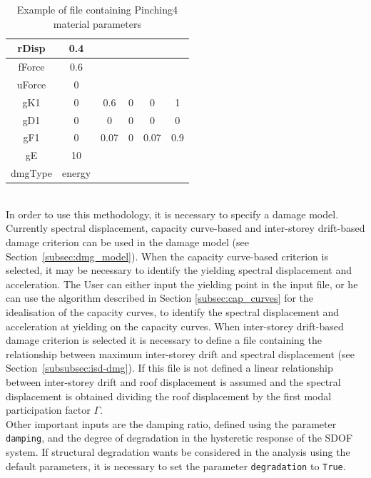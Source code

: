 \begin {table}[htb]
\caption{Example of file containing Pinching4 material parameters}
\label{table:pinching4}
\begin{center}
  \begin{tabular}{ | c | c | c | c | c | c |}
  \hline
	rDisp  & 0.4	&	&	&	 &	\\ \hline
	fForce	 & 0.6 &	&	&	 &	\\ \hline
	uForce	 & 0	&	&	&	 &	\\ \hline
	gK1	 & 0  &	0.6  &	0  &	0	 & 1\\ \hline
	gD1	 & 0	 & 0  &	0  &	0  &	0\\ \hline
	gF1	 & 0  &	0.07	 & 0  &	0.07  &	0.9\\ \hline
	gE	 & 10 &	&	&	 &\\ \hline
	dmgType	& energy &	&	&	 &\\ \hline
	\end{tabular}
\end{center}
\end{table}			
\\
In order to use this methodology, it is necessary to specify a damage model. Currently spectral displacement, capacity curve-based and inter-storey drift-based damage criterion can be used in the damage model (see Section~\ref{subsec:dmg_model}). When the capacity curve-based criterion is selected, it may be necessary to identify the yielding spectral displacement and acceleration. The User can either input the yielding point in the input file, or he can use the algorithm described in Section \ref{subsec:cap_curves} for the idealisation of the capacity curves, to identify the spectral displacement and acceleration at yielding on the capacity curves. When inter-storey drift-based damage criterion is selected it is necessary to define a file containing the relationship between maximum inter-storey drift and spectral displacement (see Section~\ref{subsubsec:isd-dmg}). If this file is not defined a linear relationship between inter-storey drift and roof displacement is assumed and the spectral displacement is obtained dividing the roof displacement by the first modal participation factor $\Gamma$. \\

Other important inputs are the damping ratio, defined using the parameter \verb=damping=, and the degree of degradation in the hysteretic response of the SDOF system. If structural degradation wants be considered in the analysis using the default parameters, it is necessary to set the parameter \verb=degradation= to \verb=True=.

